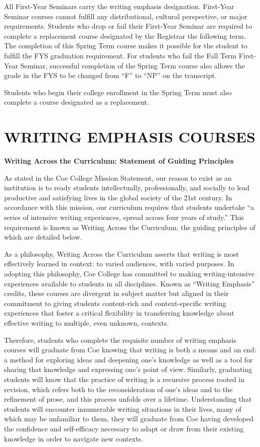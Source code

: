 \documentclass[
  letterpaper,
]{scrbook}
\begin{document}
All First-Year Seminars carry the writing emphasis designation.
First-Year Seminar courses cannot fulfill any distributional, cultural
perspective, or major requirements. Students who drop or fail their
First-Year Seminar are required to complete a replacement course
designated by the Registrar the following term. The completion of this
Spring Term course makes it possible for the student to fulfill the FYS
graduation requirement. For students who fail the Fall Term First-Year
Seminar, successful completion of the Spring Term course also allows the
grade in the FYS to be changed from ``F'' to ``NP'' on the transcript.

Students who begin their college enrollment in the Spring Term must also
complete a course designated as a replacement.

\hypertarget{sec-writing-emphasis-courses}{%
\chapter{WRITING EMPHASIS COURSES}\label{sec-writing-emphasis-courses}}

\textbf{Writing Across the Curriculum: Statement of Guiding Principles}

As stated in the Coe College Mission Statement, our reason to exist as
an institution is to ready students intellectually, professionally, and
socially to lead productive and satisfying lives in the global society
of the 21st century. In accordance with this mission, our curriculum
requires that students undertake ``a series of intensive writing
experiences, spread across four years of study.'' This requirement is
known as Writing Across the Curriculum, the guiding principles of which
are detailed below.

As a philosophy, Writing Across the Curriculum asserts that writing is
most effectively learned in context: to varied audiences, with varied
purposes. In adopting this philosophy, Coe College has committed to
making writing-intensive experiences available to students in all
disciplines. Known as ``Writing Emphasis'' credits, these courses are
divergent in subject matter but aligned in their commitment to giving
students content-rich and context-specific writing experiences that
foster a critical flexibility in transferring knowledge about effective
writing to multiple, even unknown, contexts.

Therefore, students who complete the requisite number of writing
emphasis courses will graduate from Coe knowing that writing is both a
means and an end: a method for exploring ideas and deepening one's
knowledge as well as a tool for sharing that knowledge and expressing
one's point of view. Similarly, graduating students will know that the
practice of writing is a recursive process rooted in revision, which
refers both to the reconsideration of one's ideas and to the refinement
of prose, and this process unfolds over a lifetime. Understanding that
students will encounter innumerable writing situations in their lives,
many of which may be unfamiliar to them, they will graduate from Coe
having developed the confidence and self-efficacy necessary to adapt or
draw from their existing knowledge in order to navigate new contexts.
\end{document}
